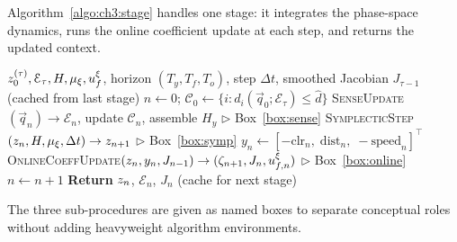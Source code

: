 Algorithm~\ref{algo:ch3:stage} handles one stage: it integrates
the phase-space dynamics, runs the online coefficient update at
each step, and returns the updated context.

\begin{algorithm}[t]
\caption{GRL-SNAM: Per-Stage Rollout and Online Update}
\label{algo:ch3:stage}
\begin{algorithmic}[1]
\Require $z_0^{(\tau)}, \mathcal{E}_\tau, H, \mu_\xi, u_f^\xi$,
         horizon $(T_y, T_f, T_o)$, step $\Delta t$,
         smoothed Jacobian $J_{\tau-1}$ (cached from last stage)
\State $n \leftarrow 0$;\; $\mathcal{C}_0 \leftarrow \{i : d_i(\vec{q}_0;\mathcal{E}_\tau) \leq \hat{d}\}$
    \State \textsc{SenseUpdate}$(\vec{q}_n) \to \mathcal{E}_n$,
           update $\mathcal{C}_n$, assemble $H_y$
           \hfill $\triangleright$ Box~\ref{box:sense}
  \EndIf
  \State \textsc{SymplecticStep}$(z_n, H, \mu_\xi, \Delta t)
         \to z_{n+1}$
         \hfill $\triangleright$ Box~\ref{box:symp}
  \State $y_n \leftarrow [-\mathrm{clr}_n,\;\mathrm{dist}_n,\;-\mathrm{speed}_n]^\top$
  \State \textsc{OnlineCoeffUpdate}$(z_n, y_n, J_{n-1})
         \to (\zeta_{n+1}, J_n, u_{f,n}^\xi)$
         \hfill $\triangleright$ Box~\ref{box:online}
  \State $n \leftarrow n + 1$
\EndWhile
\State \textbf{Return} $z_n$, $\mathcal{E}_n$, $J_n$ (cache for next stage)
\end{algorithmic}
\end{algorithm}

The three sub-procedures are given as named boxes to separate
conceptual roles without adding heavyweight algorithm environments.

